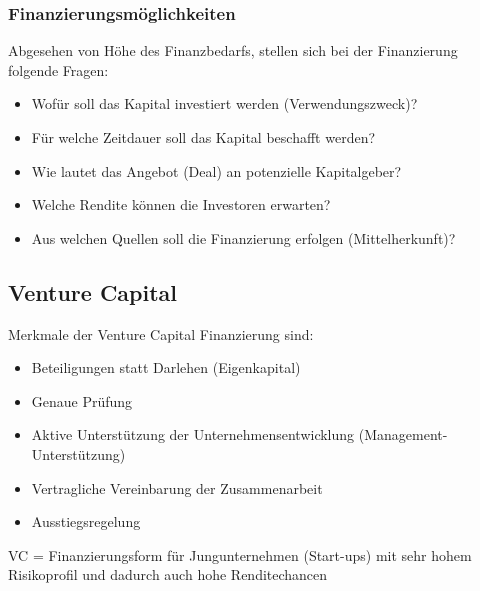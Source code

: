 \subsubsection{Finanzierungsmöglichkeiten}
Abgesehen von Höhe des Finanzbedarfs, stellen sich bei der Finanzierung folgende Fragen:
\begin{itemize}
	\item Wofür soll das Kapital investiert werden (Verwendungszweck)?
	\item Für welche Zeitdauer soll das Kapital beschafft werden?
	\item Wie lautet das Angebot (Deal) an potenzielle Kapitalgeber?
	\item Welche Rendite können die Investoren erwarten?
	\item Aus welchen Quellen soll die Finanzierung erfolgen (Mittelherkunft)?
\end{itemize}

\subsection{Venture Capital}
Merkmale der Venture Capital Finanzierung sind:
\begin{itemize}
	\item Beteiligungen statt Darlehen (Eigenkapital)
	\item Genaue Prüfung
	\item Aktive Unterstützung der Unternehmensentwicklung (Management-Unterstützung)
	\item Vertragliche Vereinbarung der Zusammenarbeit
	\item Ausstiegsregelung
\end{itemize}
VC = Finanzierungsform für Jungunternehmen (Start-ups) mit sehr hohem Risikoprofil und dadurch auch hohe Renditechancen

